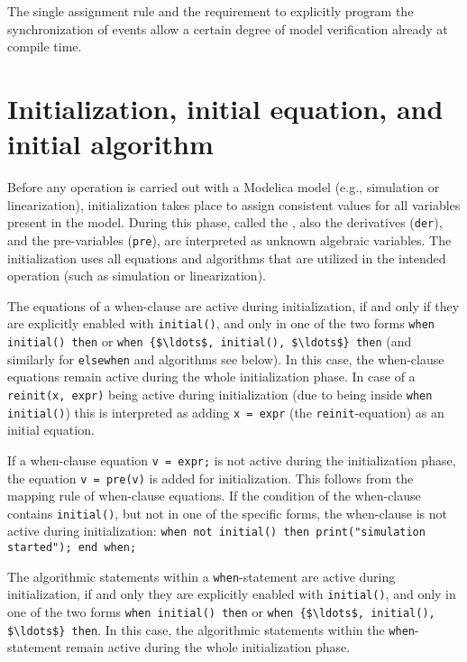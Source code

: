 \begin{nonnormative}
The single assignment rule and the requirement to explicitly
program the synchronization of events allow a certain degree of model
verification already at compile time.
\end{nonnormative}

\section{Initialization, initial equation, and initial algorithm}\label{initialization-initial-equation-and-initial-algorithm}

Before any operation is carried out with a Modelica model (e.g., simulation or linearization), initialization takes place to assign consistent values for all variables present in the model.
During this phase, called the , also the derivatives (\lstinline!der!), and the pre-variables (\lstinline!pre!), are interpreted as unknown algebraic variables.
The initialization uses all equations and algorithms that are utilized in the intended operation (such as simulation or linearization).

The equations of a when-clause are active during initialization, if and only if they are explicitly enabled with \lstinline!initial()!, and only in one of the two forms
\lstinline!when initial() then! or \lstinline!when {$\ldots$, initial(), $\ldots$} then! (and similarly for \lstinline!elsewhen! and algorithms see below).  In this case, the when-clause equations remain active during the
whole initialization phase.  In case of a \lstinline!reinit(x, expr)! being active during initialization (due to being inside \lstinline!when initial()!) this is interpreted as adding
\lstinline!x = expr! (the \lstinline!reinit!-equation) as an initial equation.

\begin{nonnormative}
If a when-clause equation \lstinline!v = expr;! is not active during the initialization phase, the equation \lstinline!v = pre(v)! is added for
initialization.  This follows from the mapping rule of when-clause equations.  If the condition of the when-clause contains \lstinline!initial()!,
but not in one of the specific forms, the when-clause is not active during initialization: \lstinline!when not initial() then print("simulation started"); end when;!
\end{nonnormative}

The algorithmic statements within a \lstinline!when!-statement are active during initialization, if and only they are explicitly enabled with \lstinline!initial()!, and only in one of the two forms \lstinline!when initial() then! or \lstinline!when {$\ldots$, initial(), $\ldots$} then!.
In this case, the algorithmic statements within the \lstinline!when!-statement remain active during the whole initialization phase.


